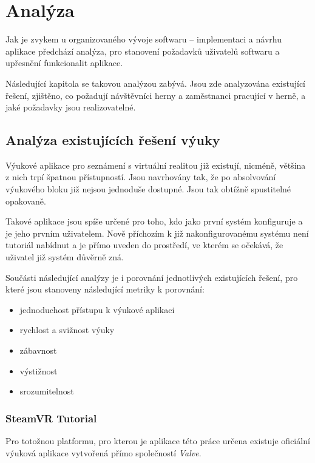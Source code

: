\chapter{Analýza}\label{analuxfdza}

Jak je zvykem u organizovaného vývoje softwaru -- implementaci a návrhu
aplikace předchází analýza, pro stanovení požadavků uživatelů softwaru a
upřesnění funkcionalit aplikace.

Následující kapitola se takovou analýzou zabývá. Jsou zde analyzována
existující řešení, zjištěno, co požadují návštěvníci herny a
zaměstnanci pracující v herně, a jaké požadavky jsou realizovatelné.

\section{Analýza existujících řešení
výuky}\label{analuxfdza-existujuxedcuxedch-ux159eux161enuxed-vuxfduky}

Výukové aplikace pro seznámení s virtuální realitou již existují,
nicméně, většina z nich trpí špatnou přístupností. Jsou navrhovány tak,
že po absolvování výukového bloku již nejsou jednoduše dostupné. Jsou tak
obtížně spustitelné opakovaně.

Takové aplikace jsou spíše určené pro toho, kdo jako první systém
konfiguruje a je jeho prvním uživatelem. Nově příchozím k
již nakonfigurovanému systému není tutoriál nabídnut a je přímo uveden do
prostředí, ve kterém se očekává, že uživatel již systém důvěrně zná.

\newpage 

Součásti následující analýzy je i porovnání jednotlivých existujících řešení, pro
které jsou stanoveny následující metriky k porovnání:

\begin{itemize}
\tightlist
\item
  jednoduchost přístupu k výukové aplikaci
\item
  rychlost a svižnost výuky
\item
  zábavnost
\item
  výstižnost
\item
  srozumitelnost
\end{itemize}

\subsection{SteamVR Tutorial}\label{steamvr-tutorial}

Pro totožnou platformu, pro kterou je aplikace této práce
určena existuje oficiální výuková aplikace vytvořená přímo společností
\emph{Valve}.

